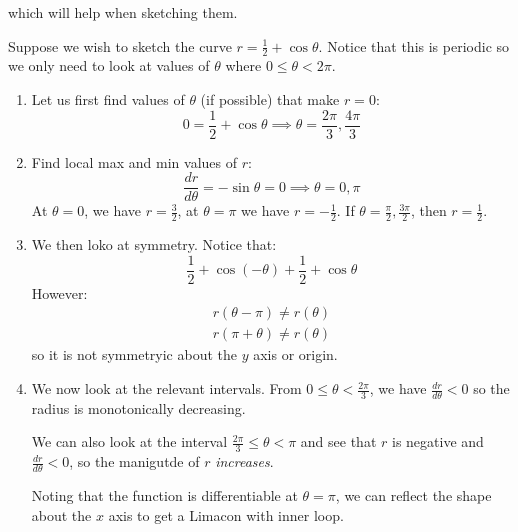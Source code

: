 \begin{itemize}
    which will help when sketching them.
    \begin{example}
        Suppose we wish to sketch the curve $r= \frac{1}{2} + \cos\theta$. Notice that this is periodic so we only need to look at values of $\theta$ where $0 \le \theta < 2\pi$.
        \begin{enumerate}
            \item Let us first find values of $\theta$ (if possible) that make $r=0$:
            \begin{equation}
                0 = \frac{1}{2} + \cos\theta \implies \theta = \frac{2\pi}{3}, \frac{4\pi}{3}
            \end{equation}
            \item Find local max and min values of $r$:
            \begin{equation}
                \frac{dr}{d\theta} = -\sin\theta = 0 \implies \theta = 0, \pi
            \end{equation}
            At $\theta=0$, we have $r=\frac{3}{2}$, at $\theta= \pi$ we have $r = -\frac{1}{2}$. If $\theta = \frac{\pi}{2}, \frac{3\pi}{2}$, then $r=\frac{1}{2}$.
            \item We then loko at symmetry. Notice that:
            \begin{equation}
                \frac{1}{2} + \cos(-\theta) + \frac{1}{2}+\cos\theta
            \end{equation}
            However:
            \begin{align}
                r(\theta - \pi) \neq r(\theta) \\ 
                r(\pi + \theta) \neq r(\theta)
            \end{align}
            so it is not symmetryic about the $y$ axis or origin.
            \item We now look at the relevant intervals. From $0 \le \theta < \frac{2\pi}{3}$, we have $\frac{dr}{d\theta} < 0$ so the radius is monotonically decreasing.
            \vspace{2mm}

            We can also look at the interval $\frac{2\pi}{3} \le \theta < \pi$ and see that $r$ is negative and $\frac{dr}{d\theta} < 0$, so the manigutde of $r$ \textit{increases}.
            \vspace{2mm}

            Noting that the function is differentiable at $\theta=\pi$, we can reflect the shape about the $x$ axis to get a Limacon with inner loop.
        \end{enumerate}
    

\end{example}
\end{itemize}
